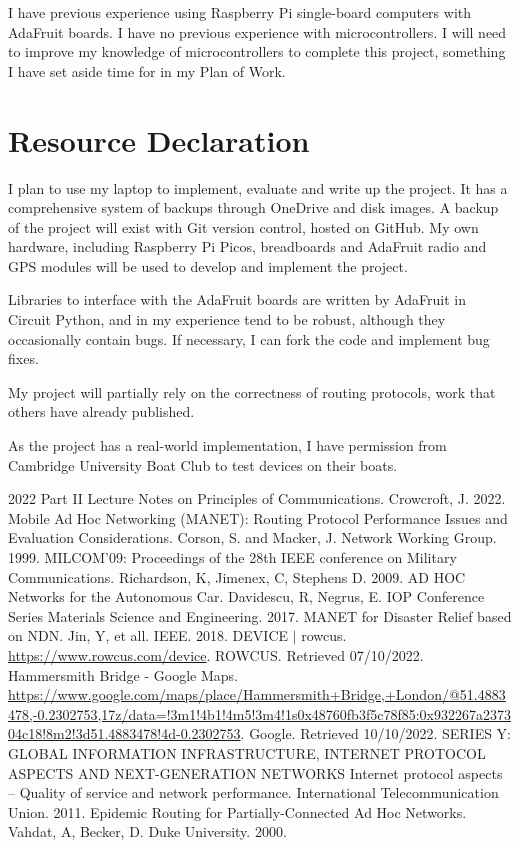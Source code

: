 \documentclass[10pt, a4paper]{article}
\begin{document}
I have previous experience using Raspberry Pi single-board computers with AdaFruit boards. I have no previous experience with microcontrollers. I will need to improve my knowledge of microcontrollers to complete this project, something I have set aside time for in my Plan of Work.


\section{Resource Declaration}
I plan to use my laptop to implement, evaluate and write up the project. It has a comprehensive system of backups through OneDrive and disk images. A backup of the project will exist with Git version control, hosted on GitHub. My own hardware, including Raspberry Pi Picos, breadboards and AdaFruit radio and GPS modules will be used to develop and implement the project.\par

Libraries to interface with the AdaFruit boards are written by AdaFruit in Circuit Python, and in my experience tend to be robust, although they occasionally contain bugs. If necessary, I can fork the code and implement bug fixes. \par

My project will partially rely on the correctness of routing protocols, work that others have already published. \cite{epidemic} \par

As the project has a real-world implementation, I have permission from Cambridge University Boat Club to test devices on their boats.


\begin{thebibliography}{9}
 2022 Part II Lecture Notes on Principles of Communications. Crowcroft, J. 2022.
 Mobile Ad Hoc Networking (MANET): Routing Protocol Performance Issues and Evaluation Considerations. Corson, S. and Macker, J. Network Working Group. 1999.
 MILCOM'09: Proceedings of the 28th IEEE conference on Military Communications. Richardson, K, Jimenex, C, Stephens D. 2009.
 AD HOC Networks for the Autonomous Car. Davidescu, R, Negrus, E. IOP Conference Series Materials Science and Engineering. 2017.
 MANET for Disaster Relief based on NDN. Jin, Y, et all. IEEE. 2018.
 DEVICE $\vert$ rowcus. \url{https://www.rowcus.com/device}. ROWCUS. Retrieved 07/10/2022.
 Hammersmith Bridge - Google Maps. \url{https://www.google.com/maps/place/Hammersmith+Bridge,+London/@51.4883478,-0.2302753,17z/data=!3m1!4b1!4m5!3m4!1s0x48760fb3f5c78f85:0x932267a237304c18!8m2!3d51.4883478!4d-0.2302753}. Google. Retrieved 10/10/2022.
 SERIES Y: GLOBAL INFORMATION 
INFRASTRUCTURE, INTERNET PROTOCOL ASPECTS 
AND NEXT-GENERATION NETWORKS 
Internet protocol aspects – Quality of service and network 
performance. International Telecommunication Union. 2011.
 Epidemic Routing for Partially-Connected Ad Hoc Networks. Vahdat, A, Becker, D. Duke University. 2000.
\end{thebibliography}
\end{document}
